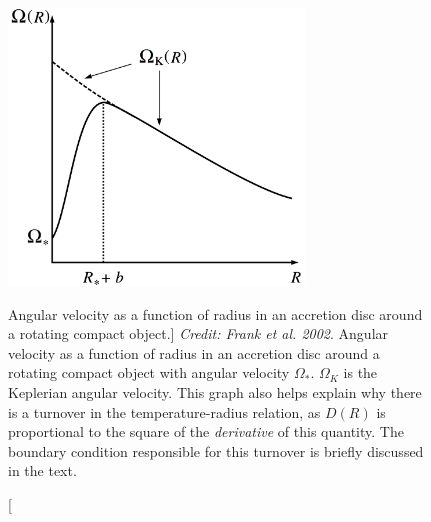 \begin{figure}
\centering
\includegraphics[width=0.7\textwidth]{figures/01-intro/omega.png}
\caption
[Angular velocity as a function of radius in an accretion disc around a rotating
compact object.]
{
{\sl Credit: Frank et al. 2002}.
Angular velocity as a function of radius in an accretion disc around a rotating
compact object with angular velocity $\Omega_*$. $\Omega_K$ is the Keplerian 
angular velocity. This graph
also helps explain why there is a turnover in the temperature-radius relation,
as $D(R)$ is proportional to the square of the {\em derivative} of this quantity.
The boundary condition responsible for this turnover is briefly 
discussed in the text.
} 
\label{fig:omega}
\end{figure}

